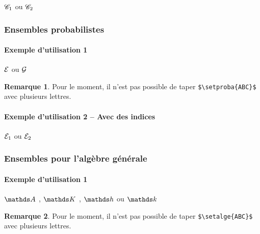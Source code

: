 \documentclass[12pt,a4paper]{article}
\theoremstyle{definition}
\newtheorem*{remark}{Remarque}
\begin{document}
\begin{latexex}
$\setgeo*{C}{1}$ ou
$\setgeo*{C}{2}$
\end{latexex}




\subsubsection{Ensembles probabilistes}

\paragraph{Exemple d'utilisation 1}

\begin{latexex}
$\setproba{E}$ ou
$\setproba{G}$
\end{latexex}

\begin{remark}
	Pour le moment, il n'est pas possible de taper \verb+$\setproba{ABC}$+ avec plusieurs lettres.
\end{remark}




\paragraph{Exemple d'utilisation 2 -- Avec des indices}

\begin{latexex}
$\setproba*{E}{1}$ ou
$\setproba*{E}{2}$
\end{latexex}




\subsubsection{Ensembles pour l'algèbre générale}

\paragraph{Exemple d'utilisation 1}

\begin{latexex}
$\setalge{A}$ ,
$\setalge{K}$ ,
$\setalge{h}$ ou
$\setalge{k}$
\end{latexex}

\begin{remark}
	Pour le moment, il n'est pas possible de taper \verb+$\setalge{ABC}$+ avec plusieurs lettres.
\end{remark}
\end{document}
